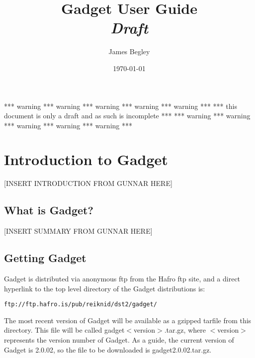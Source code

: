\documentclass [a4paper, 10pt]{book}
\begin{document}
\title{\Huge{Gadget User Guide}\\ \huge{\textit{Draft}}}
\author{James Begley}
\date{\today}
\maketitle

\setlength{\parindent}{0pt}

\tableofcontents

\newpage
*** warning *** warning *** warning *** warning *** warning ***\newline
*** this document is only a draft and as such is incomplete ***\newline
*** warning *** warning *** warning *** warning *** warning ***\newline

\chapter{Introduction to Gadget}\label{chap:intro}
[INSERT INTRODUCTION FROM GUNNAR HERE]

\section{What is Gadget?}\label{sec:whatisgadget}
[INSERT SUMMARY FROM GUNNAR HERE]

\section{Getting Gadget}\label{sec:gettinggadget}
Gadget is distributed via anonymous ftp from the Hafro ftp site, and a direct hyperlink to the top level directory of the Gadget distributions is:

\begin{verbatim}
ftp://ftp.hafro.is/pub/reiknid/dst2/gadget/
\end{verbatim}

The most recent version of Gadget will be available as a gzipped tarfile from this directory.  This file will be called gadget$<$version$>$.tar.gz, where $<$version$>$ represents the version number of Gadget.  As a guide, the current version of Gadget is 2.0.02, so the file to be downloaded is gadget2.0.02.tar.gz.
\end{document}

